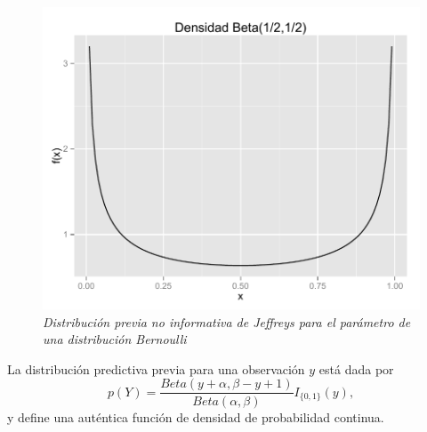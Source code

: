     \begin{figure}[!htb]\label{jefber1}
    \centering
    \includegraphics[scale=0.5]{Beta_no_inf.pdf}
    \caption{\emph{Distribuci\'on previa no informativa de Jeffreys para el par\'ametro de una distribuci\'on Bernoulli}}
    \end{figure}
    
    \begin{Res}
    La distribuci\'on predictiva previa para una observaci\'on $y$ est\'a dada por
    \begin{equation}\label{Predi_previa_bernou}
    p(Y)=\frac{Beta(y+\alpha,\beta-y+1)}{Beta(\alpha,\beta)}I_{\{0,1\}}(y),
    \end{equation}
    y define una aut\'entica funci\'on de densidad de probabilidad continua.
    \end{Res}
    
